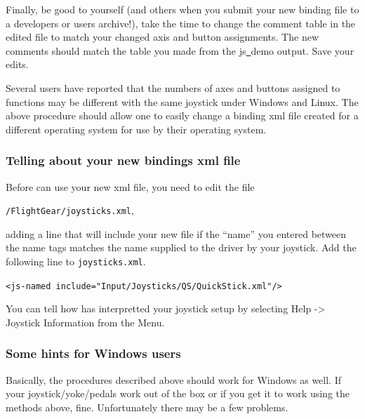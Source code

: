 Finally, be good to yourself (and others when you submit your new binding file to a \FlightGear{} developers or users archive!), take the time to change the comment table in the edited file to match your changed axis and button assignments.  The new comments should match the table you made from the js\underline{~}demo output.  Save your edits.

Several users have reported that the numbers of axes and buttons assigned to functions may be different with the same joystick under Windows and Linux.  The above procedure should allow one to easily change a binding xml file created for a different operating system for use by their operating system.

\subsubsection{Telling \FlightGear{} about your new bindings xml file\label{telling}}
Before \FlightGear{} can use your new xml file, you need to edit the file

\noindent
 \texttt{/FlightGear/joysticks.xml},


\noindent 
adding a line that will include your new file if the ``name'' you entered between the name tags matches the name supplied to the driver by your joystick.  Add the following line to \texttt{joysticks.xml}.
\medskip

\noindent
	\texttt{<js-named include="Input/Joysticks/QS/QuickStick.xml"/>}
\medskip

You can tell how \FlightGear{} has interpretted your joystick setup by selecting
Help -> Joystick Information from the Menu.

\subsubsection{Some hints for Windows users\label{joyxp}}
Basically, the procedures described above should work for Windows as well. If your joystick/yoke/pedals work out of the box or if you get it to work using the methods above, fine. Unfortunately there may be a few problems.

